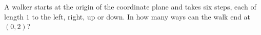 A walker starts at the origin of the coordinate plane and takes six steps, each of length $1$ to the left, right, up or down. In how many ways can the walk end at $(0,2)$?
